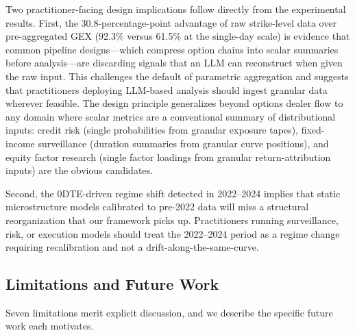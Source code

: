 \documentclass[jrfm,article,accept,moreauthors,pdftex]{Definitions/mdpi}
\begin{document}
Two practitioner-facing design implications follow directly from the
experimental results. First, the 30.8-percentage-point advantage of raw
strike-level data over pre-aggregated GEX (92.3\% versus 61.5\% at the
single-day scale) is evidence that common pipeline designs---which
compress option chains into scalar summaries before analysis---are
discarding signals that an LLM can reconstruct when given the raw input.
This challenges the default of parametric aggregation and suggests that
practitioners deploying LLM-based analysis should ingest granular data
wherever feasible. The design principle generalizes beyond options
dealer flow to any domain where scalar metrics are a conventional summary
of distributional inputs: credit risk (single probabilities from granular
exposure tapes), fixed-income surveillance (duration summaries from
granular curve positions), and equity factor research (single factor
loadings from granular return-attribution inputs) are the obvious
candidates.

Second, the 0DTE-driven regime shift detected in 2022--2024 implies
that static microstructure models calibrated to pre-2022 data will miss
a structural reorganization that our framework picks up. Practitioners
running surveillance, risk, or execution models should treat the
2022--2024 period as a regime change requiring recalibration and not a
drift-along-the-same-curve.

\subsection{Limitations and Future Work}
\label{sec:limitations}

Seven limitations merit explicit discussion, and we describe the specific
future work each motivates.
\end{document}

